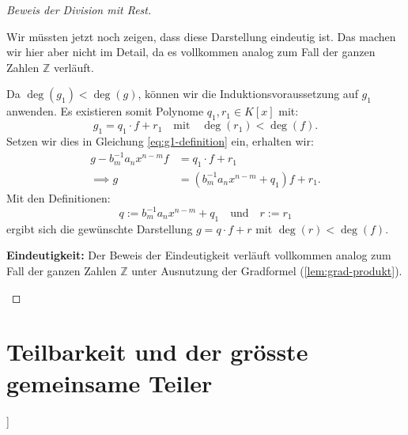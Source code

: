 \begin{proof}[Beweis der Division mit Rest]
\begin{spoken-clean}[00:28:00 - 00:28:47]
Wir müssten jetzt noch zeigen, dass diese Darstellung eindeutig ist. Das machen wir hier aber nicht im Detail, da es vollkommen analog zum Fall der ganzen Zahlen $\mathbb{Z}$ verläuft.
\end{spoken-clean}

\begin{math-stroke}
Da $\deg(g_1) < \deg(g)$, können wir die Induktionsvoraussetzung auf $g_1$ anwenden. Es existieren somit Polynome $q_1, r_1 \in K[x]$ mit:
\[
g_1 = q_1 \cdot f + r_1 \quad \text{mit} \quad \deg(r_1) < \deg(f).
\]
Setzen wir dies in Gleichung \eqref{eq:g1-definition} ein, erhalten wir:
\begin{align*}
g - b_m^{-1} a_n x^{n-m} f &= q_1 \cdot f + r_1 \\
\implies g &= \left( b_m^{-1} a_n x^{n-m} + q_1 \right) f + r_1.
\end{align*}
Mit den Definitionen:
\[
q := b_m^{-1} a_n x^{n-m} + q_1 \quad \text{und} \quad r := r_1
\]
ergibt sich die gewünschte Darstellung $g = q \cdot f + r$ mit $\deg(r) < \deg(f)$.

\textbf{Eindeutigkeit:}
Der Beweis der Eindeutigkeit verläuft vollkommen analog zum Fall der ganzen Zahlen $\mathbb{Z}$ unter Ausnutzung der Gradformel (\cref{lem:grad-produkt}).
\end{math-stroke}
\end{proof}

\section{Teilbarkeit und der grösste gemeinsame Teiler}

\begin{math-stroke}[Teilbarkeit in K[x]]
\end{math-stroke}

